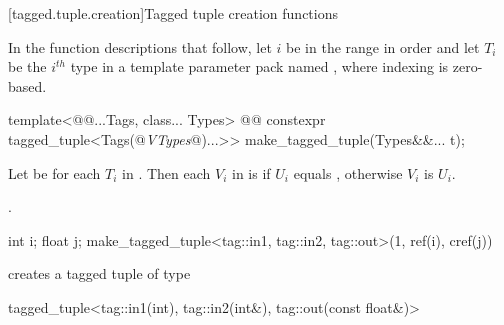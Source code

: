 {[tagged.tuple.creation]{Tagged tuple creation functions}

\pnum
In the function descriptions that follow, let $i$ be in the range 
in order and let $T_i$ be the $i^{th}$ type in a template parameter pack named ,
where indexing is zero-based.

%
%
\begin{itemdecl}
template<@@...Tags, class... Types>
  @@
    constexpr tagged_tuple<Tags(@\textit{VTypes}@)...>> make_tagged_tuple(Types&&... t);
\end{itemdecl}

\begin{itemdescr} \pnum Let  be  for each
$T_i$ in . Then each $V_i$ in  is
 if $U_i$ equals , otherwise
$V_i$ is $U_i$.

\pnum
\returns {}.

\pnum
\enterexample

\begin{codeblock}
int i; float j;
make_tagged_tuple<tag::in1, tag::in2, tag::out>(1, ref(i), cref(j))
\end{codeblock}

creates a tagged tuple of type

\begin{codeblock}
tagged_tuple<tag::in1(int), tag::in2(int&), tag::out(const float&)>
\end{codeblock}
\exitexample
\end{itemdescr}
}

